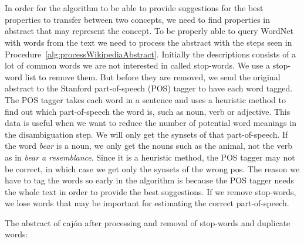 \noindent{}
\\\\In order for the algorithm to be able to provide suggestions for the best properties to transfer between two concepts, we need to find properties in abstract that may represent the concept. To be properly able to query WordNet with words from the text we need to process the abstract with the steps seen in Procedure~\ref{alg:processWikipediaAbstract}. Initially the descriptions consists of a lot of common words we are not interested in called stop-words. We use a stop-word list to remove them. But before they are removed, we send the original abstract to the Stanford part-of-speech (POS) tagger to have each word tagged. The POS tagger takes each word in a sentence and uses a heuristic method to find out which part-of-speech the word is, such as noun, verb or adjective. This data is useful when we want to reduce the number of potential word meanings in the disambiguation step. We will only get the synsets of that part-of-speech. If the word \emph{bear} is a noun, we only get the nouns such as the animal, not the verb as in \emph{bear a resemblance}. Since it is a heuristic method, the POS tagger may not be correct, in which case we get only the synsets of the wrong pos. The reason we have to tag the words so early in the algorithm is because the POS tagger needs the whole text in order to provide the best suggestions. If we remove stop-words, we lose words that may be important for estimating the correct part-of-speech. 

The abstract of cajón after processing and removal of stop-words and duplicate words:\\

\noindent{}

